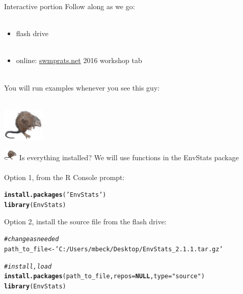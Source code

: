 \documentclass[xcolor=dvipsnames,serif]{beamer}\usepackage[]{graphicx}\usepackage[]{color}
\makeatletter
\newcommand{\hlstr}[1]{\textcolor[rgb]{0.192,0.494,0.8}{#1}}%
\newcommand{\hlcom}[1]{\textcolor[rgb]{0.678,0.584,0.686}{\textit{#1}}}%
\newcommand{\hlstd}[1]{\textcolor[rgb]{0.345,0.345,0.345}{#1}}%
\newcommand{\hlkwa}[1]{\textcolor[rgb]{0.161,0.373,0.58}{\textbf{#1}}}%
\newcommand{\hlkwb}[1]{\textcolor[rgb]{0.69,0.353,0.396}{#1}}%
\newcommand{\hlkwc}[1]{\textcolor[rgb]{0.333,0.667,0.333}{#1}}%
\newcommand{\hlkwd}[1]{\textcolor[rgb]{0.737,0.353,0.396}{\textbf{#1}}}%
\newenvironment{kframe}{%
 \def\at@end@of@kframe{}%
 \ifinner\ifhmode%
  \def\at@end@of@kframe{\end{minipage}}%
  \begin{minipage}{\columnwidth}%
 \fi\fi%
 \def\FrameCommand##1{\hskip\@totalleftmargin \hskip-\fboxsep
 \colorbox{shadecolor}{##1}\hskip-\fboxsep
     \hskip-\linewidth \hskip-\@totalleftmargin \hskip\columnwidth}%
 \MakeFramed {\advance\hsize-\width
   \@totalleftmargin\z@ \linewidth\hsize
   \@setminipage}}%
 {\par\unskip\endMakeFramed%
 \at@end@of@kframe}
\newenvironment{knitrout}{}{} %
\makeatother
\begin{document}
\begin{frame}{Interactive portion}
\onslide<+->
Follow along as we go:\\~\\
\begin{itemize}
\item flash drive\\~\\
\item online: \href{http://swmprats.net/}{swmprats.net} 2016 workshop tab \\~\\
\end{itemize}
\onslide<+->
You will run examples whenever you see this guy: \\~\\
\centerline{\includegraphics[width = 0.15\textwidth]{imgs/swmprat.png}}
\end{frame}

\begin{frame}[fragile]{\includegraphics[width = 0.05\textwidth]{imgs/swmprat.png} Is everything installed?}
We will use functions in the EnvStats package \\~\\
Option 1, from the R Console prompt:
\begin{knitrout}\scriptsize
{}\color{fgcolor}\begin{kframe}
\begin{alltt}
\hlkwd{install.packages}\hlstd{(}\hlstr{'EnvStats'}\hlstd{)}
\hlkwd{library}\hlstd{(EnvStats)}
\end{alltt}
\end{kframe}
\end{knitrout}
\vspace{0.1in}
Option 2, install the source file from the flash drive:
\begin{knitrout}\scriptsize
{}\color{fgcolor}\begin{kframe}
\begin{alltt}
\hlcom{# change as needed}
\hlstd{path_to_file} \hlkwb{<-} \hlstr{'C:/Users/mbeck/Desktop/EnvStats_2.1.1.tar.gz'}

\hlcom{# install, load}
\hlkwd{install.packages}\hlstd{(path_to_file,} \hlkwc{repos} \hlstd{=} \hlkwa{NULL}\hlstd{,} \hlkwc{type}\hlstd{=}\hlstr{"source"}\hlstd{)}
\hlkwd{library}\hlstd{(EnvStats)}
\end{alltt}
\end{kframe}
\end{knitrout}
\end{frame}
\end{document}
